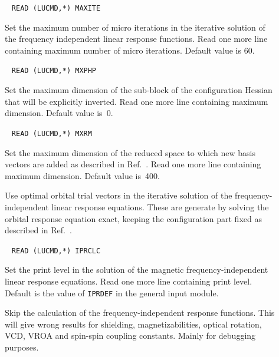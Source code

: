 \begin{description}
\item[]\verb| |\newline
\verb|READ (LUCMD,*) MAXITE|

Set the maximum number of micro iterations in the iterative solution of
the frequency independent linear response functions. Read one more line
containing maximum number of micro iterations. Default value is
60.

\item[]\verb| |\newline
\verb|READ (LUCMD,*) MXPHP|

Set the maximum dimension of the sub-block of the configuration
Hessian that will be explicitly inverted. Read one more line
containing maximum dimension. Default value is~0.

\item[]\verb| |\newline
\verb|READ (LUCMD,*) MXRM|

Set the maximum dimension of the reduced space to which new basis
vectors are added as described in Ref.~\cite{tuhjahjajpjjcp84}. Read
one more line containing maximum dimension. Default value is~400.

\item[] Use optimal orbital trial vectors in
the
iterative solution of the frequency-inde\-pen\-dent linear response
equations. These are generate by solving the orbital response equation
exact, keeping the configuration part fixed as described in
Ref.~\cite{tuhjahjajpjjcp84}. 

\item[]\verb| |\newline
\verb|READ (LUCMD,*) IPRCLC|

Set the print level in the solution of the magnetic
frequency-independent linear response equations. Read one more line
containing print level. Default is the value of \verb|IPRDEF| in
the general input module.

\item[] Skip the calculation of the frequency-independent
response functions. This will give wrong results for shielding,
magnetizabilities, optical rotation, VCD, VROA and spin-spin coupling constants. Mainly for
debugging purposes.


\end{description}

